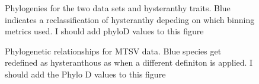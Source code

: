\documentclass{article}
\begin{document}
\begin{figure}[!tbp]
  \centering
  \caption{Phylogenies for the two data sets and hysteranthy traits. Blue indicates a reclassification of hysteranthy depeding on which binning metrics used. I should add phyloD values to this figure}
\end{figure}

\begin{figure}[h!]
  \centering
   \caption{Phylogenetic relationships for MTSV data. Blue species get redefined as hysteranthous as when a different definiton is applied. I should add the Phylo D values to this figure}
\end{figure}
\end{document}
